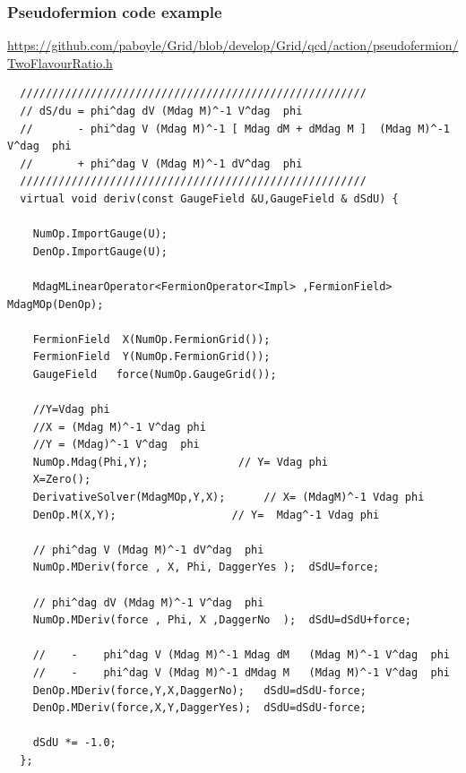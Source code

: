 \documentclass[pdf,ps,8pt]{beamer}
\newcommand{\link}[1]{\href{#1}{ {\color{blue} #1} }}
\begin{document}
\begin{frame}[fragile]\small\frametitle{ Pseudofermion code example }
\link{https://github.com/paboyle/Grid/blob/develop/Grid/qcd/action/pseudofermion/TwoFlavourRatio.h}
  {  \tiny
\begin{verbatim}
  //////////////////////////////////////////////////////
  // dS/du = phi^dag dV (Mdag M)^-1 V^dag  phi
  //       - phi^dag V (Mdag M)^-1 [ Mdag dM + dMdag M ]  (Mdag M)^-1 V^dag  phi
  //       + phi^dag V (Mdag M)^-1 dV^dag  phi
  //////////////////////////////////////////////////////
  virtual void deriv(const GaugeField &U,GaugeField & dSdU) {

    NumOp.ImportGauge(U);
    DenOp.ImportGauge(U);

    MdagMLinearOperator<FermionOperator<Impl> ,FermionField> MdagMOp(DenOp);

    FermionField  X(NumOp.FermionGrid());
    FermionField  Y(NumOp.FermionGrid());
    GaugeField   force(NumOp.GaugeGrid());	

    //Y=Vdag phi
    //X = (Mdag M)^-1 V^dag phi
    //Y = (Mdag)^-1 V^dag  phi
    NumOp.Mdag(Phi,Y);              // Y= Vdag phi
    X=Zero();
    DerivativeSolver(MdagMOp,Y,X);      // X= (MdagM)^-1 Vdag phi
    DenOp.M(X,Y);                  // Y=  Mdag^-1 Vdag phi

    // phi^dag V (Mdag M)^-1 dV^dag  phi
    NumOp.MDeriv(force , X, Phi, DaggerYes );  dSdU=force;
  
    // phi^dag dV (Mdag M)^-1 V^dag  phi
    NumOp.MDeriv(force , Phi, X ,DaggerNo  );  dSdU=dSdU+force;

    //    -    phi^dag V (Mdag M)^-1 Mdag dM   (Mdag M)^-1 V^dag  phi
    //    -    phi^dag V (Mdag M)^-1 dMdag M   (Mdag M)^-1 V^dag  phi
    DenOp.MDeriv(force,Y,X,DaggerNo);   dSdU=dSdU-force;
    DenOp.MDeriv(force,X,Y,DaggerYes);  dSdU=dSdU-force;

    dSdU *= -1.0;
  };
\end{verbatim}
}
\end{frame}
\end{document}
